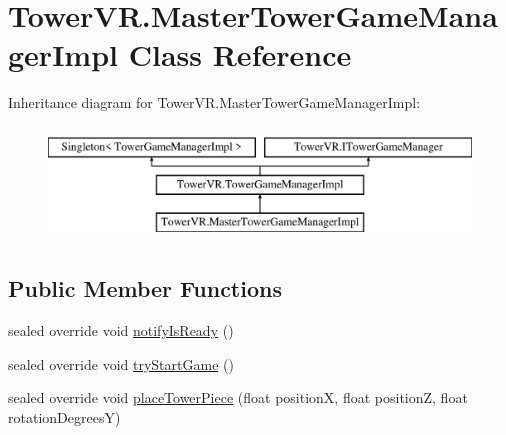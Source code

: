 \hypertarget{class_tower_v_r_1_1_master_tower_game_manager_impl}{}\section{Tower\+V\+R.\+Master\+Tower\+Game\+Manager\+Impl Class Reference}
\label{class_tower_v_r_1_1_master_tower_game_manager_impl}
Inheritance diagram for Tower\+V\+R.\+Master\+Tower\+Game\+Manager\+Impl\+:\begin{figure}[H]
\begin{center}
\leavevmode
\includegraphics[height=3.000000cm]{class_tower_v_r_1_1_master_tower_game_manager_impl}
\end{center}
\end{figure}
\subsection*{Public Member Functions}
\begin{DoxyCompactItemize}
\item 
sealed override void \hyperlink{class_tower_v_r_1_1_master_tower_game_manager_impl_a318dcef324a58787554cebe80c50ef64}{notify\+Is\+Ready} ()
\item 
sealed override void \hyperlink{class_tower_v_r_1_1_master_tower_game_manager_impl_a43cb29dc14b7d9dcd90b5826c49a380d}{try\+Start\+Game} ()
\item 
sealed override void \hyperlink{class_tower_v_r_1_1_master_tower_game_manager_impl_a653a15c9e2af6c11bbd9678cd54a716b}{place\+Tower\+Piece} (float positionX, float positionZ, float rotation\+DegreesY)
\end{DoxyCompactItemize}
